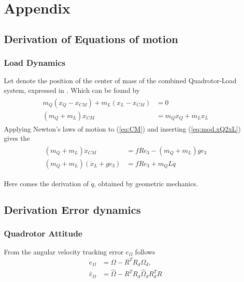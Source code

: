 \chapter{Appendix}

\section{Derivation of Equations of motion}
\subsection{Load Dynamics}\label{sec:app.loaddyn}

Let  denote the position of the center of mass of the combined Quadrotor-Load system, expressed in \IF. Which can be found by
\begin{align}\label{eq:CM}
\begin{split}
m_Q(x_Q-x_{CM})+m_L(x_L-x_{CM})&=0\\
(m_Q+m_L)x_{CM}&=m_Qx_Q+m_Lx_L
\end{split}
\end{align}
Applying Newton's laws of motion to (\ref{eq:CM}) and inserting (\ref{eq:mod.xQ2xL}) gives the 
\begin{align}\label{key}
\begin{split}
(m_Q+m_L)\ddot{x}_{CM}&=fRe_3 - (m_Q+m_L)ge_3\\
(m_Q+m_L)(\ddot{x}_L+ge_3)&= fRe_3+m_QL\ddot{q}
\end{split}
\end{align}

Here comes the derivation of $ \ddot{q} $, obtained by geometric mechanics.

\section{Derivation Error dynamics}\label{sec:app.error}
\subsection{Quadrotor Attitude}
From the angular velocity tracking error $ e_\Omega $ follows
\begin{equation}\label{eq:app.eOmega}
\begin{aligned}
e_\Omega&=\Omega-R^TR_d\Omega_d,\\
\hat{e}_\Omega&=\hat{\Omega}-R^TR_d\hat{\Omega}_dR_d^TR
\end{aligned}
\end{equation}

